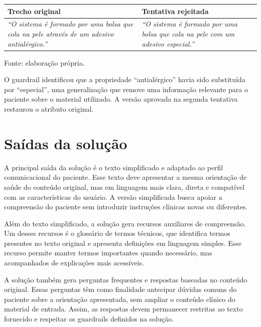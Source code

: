\begin{quadro}[htbp]
  \centering
  \caption{Exemplo de rejeição por guardrail.}
  \label{qua:guardrail-antialergico}
  \small
  \renewcommand{\arraystretch}{1.2}

  \begin{tabularx}{\textwidth}{p{} X}
    \toprule
    \textbf{Trecho original} & \textbf{Tentativa rejeitada} \\
    \midrule

    \textit{``O sistema é formado por uma bolsa que cola na pele através de um adesivo antialérgico.''}
    &
    \textit{``O sistema é formado por uma bolsa que cola na pele com um adesivo especial.''} \\

    \bottomrule
  \end{tabularx}

  \vspace{0.3em}
  {\small Fonte: elaboração própria.}
\end{quadro}

O guardrail identificou que a propriedade ``antialérgico'' havia sido substituída por ``especial'', uma generalização que remove uma informação relevante para o paciente sobre o material utilizado. A versão aprovada na segunda tentativa restaurou o atributo original.

\section{Saídas da solução} 
\label{sec:saidas-solucao} 

A principal saída da solução é o texto simplificado e adaptado ao perfil comunicacional do paciente. Esse texto deve apresentar a mesma orientação de saúde do conteúdo original, mas em linguagem mais clara, direta e compatível com as características do usuário. A versão simplificada busca apoiar a compreensão do paciente sem introduzir instruções clínicas novas ou diferentes.

Além do texto simplificado, a solução gera recursos auxiliares de compreensão. Um desses recursos é o glossário de termos técnicos, que identifica termos presentes no texto original e apresenta definições em linguagem simples. Esse recurso permite manter termos importantes quando necessário, mas acompanhados de explicações mais acessíveis. 

A solução também gera perguntas frequentes e respostas baseadas no conteúdo original. Essas perguntas têm como finalidade antecipar dúvidas comuns do paciente sobre a orientação apresentada, sem ampliar o conteúdo clínico do material de entrada. Assim, as respostas devem permanecer restritas ao texto fornecido e respeitar os guardrails definidos na solução. 

